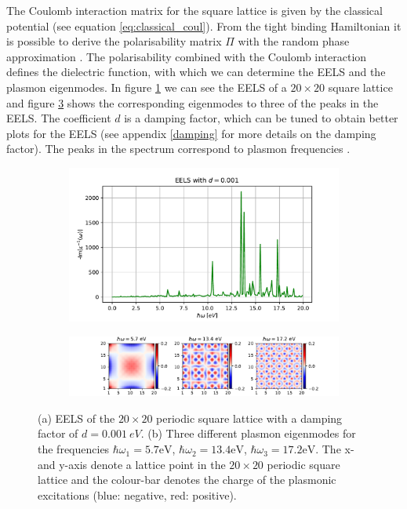 The Coulomb interaction matrix for the square lattice is given by the classical potential (see equation \ref{eq:classical_coul}). From the tight binding Hamiltonian it is possible to derive the polarisability matrix $\Pi$ with the random phase approximation \cite{Westerhout2018}. The polarisability combined with the Coulomb interaction defines the dielectric function, with which we can determine the EELS and the plasmon eigenmodes. In figure \ref{fig:sl_eels} we can see the EELS of a $20\times20$ square lattice and figure \ref{fig:sl_eig} shows the corresponding eigenmodes to three of the peaks in the EELS. The coefficient $d$ is a damping factor, which can be tuned to obtain better plots for the EELS (see appendix \ref{damping} for more details on the damping factor). The peaks in the spectrum correspond to plasmon frequencies \cite{Westerhout2018}.

\begin{figure}[H]
\centering
\begin{subfigure}[b]{0.7\textwidth}
   \includegraphics[width=1\linewidth]{img/square_lattice_eels.pdf}
   \caption{}
   \label{fig:sl_eels} 
\end{subfigure}
\begin{subfigure}[b]{1\textwidth}
   \includegraphics[width=1\linewidth]{img/square_lattice_eigenmodes.pdf}
   \caption{}
   \label{fig:sl_eig}
\end{subfigure}
\caption{(a) EELS of the $20\times20$ periodic square lattice with a damping factor of $d=\SI{0.001}{eV}$. (b) Three different plasmon eigenmodes for the frequencies $\hbar\omega_1 = 5.7\mathrm{eV}$, $\hbar\omega_2 = 13.4\mathrm{eV}$, $\hbar\omega_3 = 17.2\mathrm{eV}$. The x- and y-axis denote a lattice point in the $20\times20$ periodic square lattice and the colour-bar denotes the charge of the plasmonic excitations (blue: negative, red: positive).}
\end{figure}



